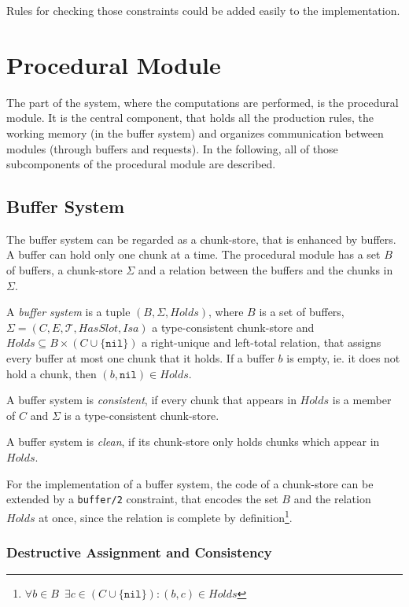 Rules for checking those constraints could be added easily to the implementation.

\section{Procedural Module}

The part of the system, where the computations are performed, is the procedural module. It is the central component, that holds all the production rules, the working memory (in the buffer system) and organizes communication between modules (through buffers and requests). In the following, all of those subcomponents of the procedural module are described.

\subsection{Buffer System}

The buffer system can be regarded as a chunk-store, that is enhanced by buffers. A buffer can hold only one chunk at a time. The procedural module has a set $B$ of buffers, a chunk-store $\Sigma$ and a relation between the buffers and the chunks in $\Sigma$.

\begin{definition}
\label{def:buffer_system}
A \emph{buffer system} is a tuple $(B,\Sigma,Holds)$, where $B$ is a set of buffers, $\Sigma = (C, E, \mathcal{T}, HasSlot, Isa)$ a type-consistent chunk-store and $Holds \subseteq B \times (C \cup \{ \mathtt{nil} \})$ a right-unique and left-total relation, that assigns every buffer at most one chunk that it holds. If a buffer $b$ is empty, ie. it does not hold a chunk, then $(b,\mathtt{nil}) \in Holds$.

A buffer system is \emph{consistent}, if every chunk that appears in $Holds$ is a member of $C$ and $\Sigma$ is a type-consistent chunk-store.

A buffer system is \emph{clean}, if its chunk-store only holds chunks which appear in $Holds$.
\end{definition}

For the implementation of a buffer system, the code of a chunk-store can be extended by a \verb|buffer/2| constraint, that encodes the set $B$ and the relation $Holds$ at once, since the relation is complete by definition\footnote{$\forall b \in B \enspace \exists c \in (C \cup \{ \mathtt{nil} \}): (b,c) \in Holds$}.

\subsubsection{Destructive Assignment and Consistency}
\label{destructive_assignment}

